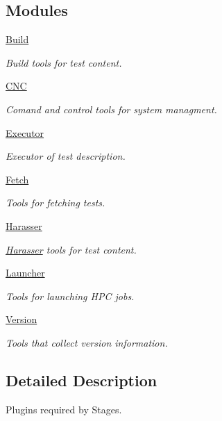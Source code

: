 \subsection*{Modules}
\begin{DoxyCompactItemize}
\item 
\hyperlink{group__Build}{Build}
\begin{DoxyCompactList}\small\item\em Build tools for test content. \end{DoxyCompactList}\item 
\hyperlink{group__CNC}{C\-N\-C}
\begin{DoxyCompactList}\small\item\em Comand and control tools for system managment. \end{DoxyCompactList}\item 
\hyperlink{group__Executor}{Executor}
\begin{DoxyCompactList}\small\item\em Executor of test description. \end{DoxyCompactList}\item 
\hyperlink{group__Fetch}{Fetch}
\begin{DoxyCompactList}\small\item\em Tools for fetching tests. \end{DoxyCompactList}\item 
\hyperlink{group__Harasser}{Harasser}
\begin{DoxyCompactList}\small\item\em \hyperlink{namespaceHarasser}{Harasser} tools for test content. \end{DoxyCompactList}\item 
\hyperlink{group__Launcher}{Launcher}
\begin{DoxyCompactList}\small\item\em Tools for launching H\-P\-C jobs. \end{DoxyCompactList}\item 
\hyperlink{group__Version}{Version}
\begin{DoxyCompactList}\small\item\em Tools that collect version information. \end{DoxyCompactList}\end{DoxyCompactItemize}


\subsection{Detailed Description}
Plugins required by Stages. 